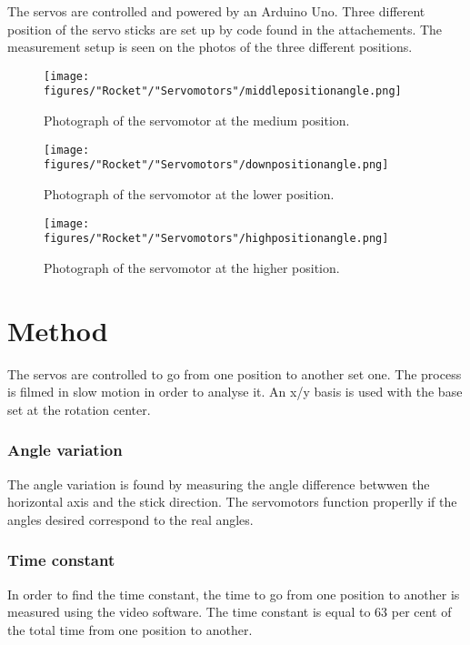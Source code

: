 The servos are controlled and powered by an Arduino Uno. Three different position of the servo sticks are set up by code found in the attachements. The measurement setup is seen on the photos of the three different positions. \

\begin{figure} [htbp]
	\centering
	\texttt{[image: figures/"Rocket"/"Servomotors"/middlepositionangle.png]}
	\caption{Photograph of the servomotor at the medium position.} \label{fig:ServoInitialPosition}
\end{figure}

\begin{figure} [htbp]
	\centering
	\texttt{[image: figures/"Rocket"/"Servomotors"/downpositionangle.png]}
	\caption{Photograph of the servomotor at the lower position.} \label{fig:ServoLowPosition}
\end{figure}

\begin{figure} [htbp]
	\centering
	\texttt{[image: figures/"Rocket"/"Servomotors"/highpositionangle.png]}
	\caption{Photograph of the servomotor at the higher position.} \label{fig:ServoHighPosition}
\end{figure}


	\section*{Method}
	
 The servos are controlled to go from one position to another set one. The process is filmed in slow motion in order to analyse it. An x/y basis is used with the base set at the rotation center.
  
		\subsubsection*{Angle variation}
		
The angle variation is found by measuring the angle difference betwwen the horizontal axis and the stick direction. The servomotors function properlly if the angles desired correspond to the real angles.

		\subsubsection*{Time constant}
		
In order to find the time constant, the time to go from one position to another is measured using the video software. The time constant is equal to 63 per cent of the total time from one position to another. 



